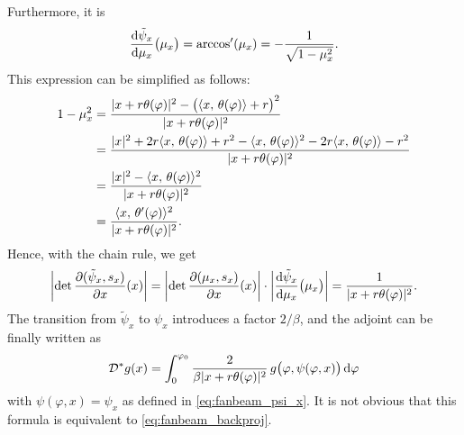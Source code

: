 \documentclass{amsart}
\renewcommand*{\phi}{\varphi}
\begin{document}
\begin{example}
 Furthermore, it is
 \begin{equation*}
  \frac{\mathrm{d} \tilde\psi_x}{\mathrm{d} \mu_x}\big(\mu_x\big) = \arccos'(\mu_x) = - \frac{1}{\sqrt{1 - \mu_x^2}}.
 \end{equation*}
 This expression can be simplified as follows:
 \begin{align*}
  1 - \mu_x^2 
  &= \frac{\ABS{x + r\theta(\phi)}^2 - \big(\INNER{x}{\theta(\phi)} + r\big)^2}{\ABS{x + r\theta(\phi)}^2} \\
  &= \frac{\ABS{x}^2 + 2r \INNER{x}{\theta(\phi)} + r^2 - \INNER{x}{\theta(\phi)}^2 - 2r\INNER{x}{\theta(\phi)} - r^2}{\ABS{x + 
  r\theta(\phi)}^2} \\
  &= \frac{\ABS{x}^2 - \INNER{x}{\theta(\phi)}^2}{\ABS{x + r\theta(\phi)}^2} \\
  &= \frac{\INNER{x}{\theta'(\phi)}^2}{\ABS{x + r\theta(\phi)}^2}.
 \end{align*}
 Hence, with the chain rule, we get
 \begin{equation*}
  \ABSLR{\DET \frac{\partial(\tilde\psi_x, s_x)}{\partial x} (x)} = \ABSLR{\DET \frac{\partial(\mu_x, s_x)}{\partial x} (x)} \cdot
  \ABSLR{\frac{\D \tilde\psi_x}{\D \mu_x}\big(\mu_x\big)} = \frac{1}{\ABS{x + r\theta(\phi)}^2}.
 \end{equation*}
 The transition from $\tilde\psi_x$ to $\psi_x$ introduces a factor $2/\beta$, and the adjoint can be finally written as
 \begin{equation}
  \label{eq:fanbeam_backproj_alt}
  \OPD^* g(x) = \int_0^{\phi_0} \frac{2}{\beta \ABS{x + r\theta(\phi)}^2}\, g\big(\phi, \psi(\phi, x)\big)\, \D \phi
 \end{equation}
 with $\psi(\phi, x) = \psi_x$ as defined in \eqref{eq:fanbeam_psi_x}. It is not obvious that this formula is equivalent to 
 \eqref{eq:fanbeam_backproj}.
\end{example}
\end{document}
